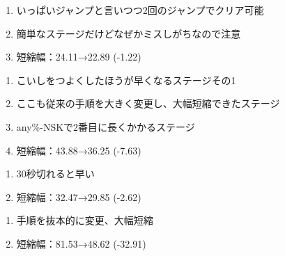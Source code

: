 \begin{enumerate}[label={\sarrow}]
\item いっぱいジャンプと言いつつ2回のジャンプでクリア可能
\item 簡単なステージだけどなぜかミスしがちなので注意
\item 短縮幅：24.11→22.89 (-1.22)
\end{enumerate}



\clearpage
\begin{enumerate}[label={\sarrow}]
\item こいしをつよくしたほうが早くなるステージその1
\item ここも従来の手順を大きく変更し、大幅短縮できたステージ
\item any\%-NSKで2番目に長くかかるステージ
\item 短縮幅：43.88→36.25 (-7.63)
\end{enumerate}



\begin{enumerate}[label={\sarrow}]
\item 30秒切れると早い
\item 短縮幅：32.47→29.85 (-2.62)
\end{enumerate}



\begin{enumerate}[label={\sarrow}]
\item 手順を抜本的に変更、大幅短縮
\item 短縮幅：81.53→48.62 (-32.91)
\end{enumerate}



